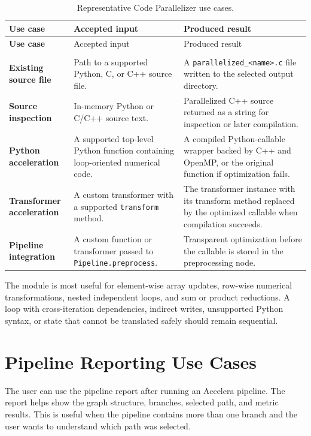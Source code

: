 \documentclass[12pt,a4paper]{report}
\newcommand{\acceleraTableStyle}{%
\small
\renewcommand{\arraystretch}{1.15}
\setlength{\tabcolsep}{4pt}%
}
\begin{document}
{\acceleraTableStyle
\renewcommand{\arraystretch}{1.02}
\setlength{\tabcolsep}{3pt}
\begin{longtable}{>{\bfseries}p{} p{} p{}}
\caption{Representative Code Parallelizer use cases.}
\label{tab:parallelizer-use-cases} \\
\toprule
Use case & Accepted input & Produced result \\
\midrule
\endfirsthead
\toprule
Use case & Accepted input & Produced result \\
\midrule
\endhead
\midrule
\multicolumn{3}{r}{\small Continued on the next page} \\
\endfoot
\bottomrule
\endlastfoot
Existing source file & Path to a supported Python, C, or C++ source file. & A
\texttt{parallelized\_<name>.c} file written to the selected output directory. \\
\addlinespace
Source inspection & In-memory Python or C/C++ source text. & Parallelized C++
source returned as a string for inspection or later compilation. \\
\addlinespace
Python acceleration & A supported top-level Python function containing
loop-oriented numerical code. & A compiled Python-callable wrapper backed by
C++ and OpenMP, or the original function if optimization fails. \\
\addlinespace
Transformer acceleration & A custom transformer with a supported
\texttt{transform} method. & The transformer instance with its transform method
replaced by the optimized callable when compilation succeeds. \\
\addlinespace
Pipeline integration & A custom function or transformer passed to
\texttt{Pipeline.preprocess}. & Transparent optimization before the callable is
stored in the preprocessing node. \\
\end{longtable}
}

The module is most useful for element-wise array updates, row-wise numerical
transformations, nested independent loops, and sum or product reductions. A
loop with cross-iteration dependencies, indirect writes, unsupported Python
syntax, or state that cannot be translated safely should remain sequential.

\section{Pipeline Reporting Use Cases}
The user can use the pipeline report after running an Accelera pipeline. The
report helps show the graph structure, branches, selected path, and metric
results. This is useful when the pipeline contains more than one branch and the
user wants to understand which path was selected.
\end{document}
